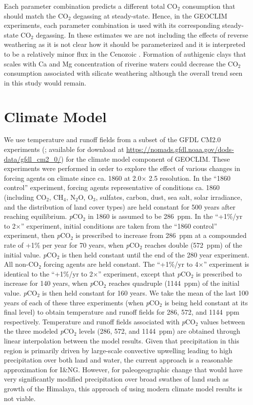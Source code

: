 \documentclass[11pt,letterpaper]{article}
\newcommand{\degrees}{\textdegree\xspace}
\newcommand{\pCOtwo}{\textit{p}CO$_{2}$\xspace}
\newcommand{\COtwo}{CO$_{2}$\xspace}
\begin{document}
Each parameter combination predicts a different total \COtwo consumption that should match the \COtwo degassing at steady-state. Hence, in the GEOCLIM experiments, each parameter combination is used with its corresponding steady-state \COtwo degassing. In these estimates we are not including the effects of reverse weathering \citep{Michalopoulos1995a} as it is not clear how it should be parameterized and it is interpreted to be a relatively minor flux in the Cenozoic \citep{Isson2018a}. Formation of authigenic clays that scales with Ca and Mg concentration of riverine waters could decrease the \COtwo consumption associated with silicate weathering although the overall trend seen in this study would remain.

\section*{Climate Model}

We use temperature and runoff fields from a subset of the GFDL CM2.0 experiments (\citealp{Delworth2006a, Delworth2006b}; available for download at \url{https://nomads.gfdl.noaa.gov/dods-data/gfdl_cm2_0/}) for the climate model component of GEOCLIM. These experiments were performed in order to explore the effect of various changes in forcing agents on climate since ca. 1860 at 2.0\degrees $\times$ 2.5\degrees resolution. In the ``1860 control'' experiment, forcing agents representative of conditions ca. 1860 (including \COtwo, CH$_{4}$, N$_{2}$O, O$_{3}$, sulfates, carbon, dust, sea salt, solar irradiance, and the distribution of land cover types) are held constant for 500 years after reaching equilibrium. \pCOtwo in 1860 is assumed to be 286~ppm. In the ``+1\%/yr to 2$\times$'' experiment, initial conditions are taken from the ``1860 control'' experiment, then \pCOtwo is prescribed to increase from 286~ppm at a compounded rate of +1\% per year for 70 years, when \pCOtwo reaches double (572~ppm) of the initial value. \pCOtwo is then held constant until the end of the 280 year experiment. All non-\COtwo forcing agents are held constant. The ``+1\%/yr to 4$\times$'' experiment is identical to the ``+1\%/yr to 2$\times$'' experiment, except that \pCOtwo is prescribed to increase for 140 years, when \pCOtwo reaches quadruple (1144~ppm) of the initial value. \pCOtwo is then held constant for 160 years. We take the mean of the last 100 years of each of these three experiments (when \pCOtwo is being held constant at its final level) to obtain temperature and runoff fields for 286, 572, and 1144~ppm respectively. Temperature and runoff fields associated with \pCOtwo values between the three modeled \pCOtwo levels (286, 572, and 1144~ppm) are obtained through linear interpolation between the model results. Given that precipitation in this region is primarily driven by large-scale convective upwelling leading to high precipitation over both land and water, the current approach is a reasonable approximation for I\&NG. However, for paleogeographic change that would have very significantly modified precipitation over broad swathes of land such as growth of the Himalaya, this approach of using modern climate model results is not viable.
\end{document}
